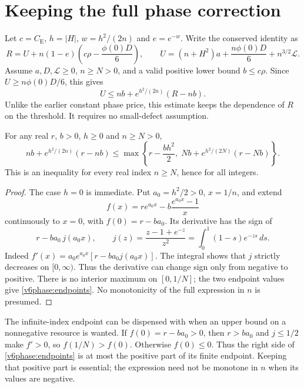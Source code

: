 \section{Keeping the full phase correction}
\label{v6phase:section}

Let $c=C_{\mathrm E}$, $h=|H|$, $w=h^2/(2n)$ and $e=e^{-w}$.
Write the conserved identity as
\[
 R=U+n(1-e)\left(c\rho-\frac{\phi(0)D}{6}\right),\qquad
 U=(n+H^2)a+\frac{n\phi(0)D}{6}+n^{3/2}\mathcal L.
\]
Assume $a,D,\mathcal L\ge0$, $n\ge N>0$, and a valid positive lower
bound $b\le c\rho$. Since $U\ge n\phi(0)D/6$, this gives
\begin{equation}\label{v6phase:exact}
 U\le nb+e^{h^2/(2n)}(R-nb).
\end{equation}
Unlike the earlier constant phase price, this estimate keeps the dependence
of $R$ on the threshold. It requires no small-defect assumption.

\begin{lemma}
\label{v6phase:index}
For any real $r$, $b>0$, $h\ge0$ and $n\ge N>0$,
\begin{equation}\label{v6phase:endpoints}
 nb+e^{h^2/(2n)}(r-nb)
 \le\max\left\{r-\frac{bh^2}{2},\;
 Nb+e^{h^2/(2N)}(r-Nb)\right\}.
\end{equation}
This is an inequality for every real index $n\ge N$, hence for all integers.
\end{lemma}
\begin{proof}
The case $h=0$ is immediate. Put $a_0=h^2/2>0$, $x=1/n$, and extend
\[
 f(x)=re^{a_0x}-b\frac{e^{a_0x}-1}{x}
\]
continuously to $x=0$, with $f(0)=r-ba_0$. Its derivative has the sign of
\[
 r-ba_0\,j(a_0x),\qquad
 j(z)=\frac{z-1+e^{-z}}{z^2}
     =\int_0^1(1-s)e^{-zs}\,ds.
\]
Indeed $f'(x)=a_0e^{a_0x}[r-ba_0j(a_0x)]$.
The integral shows that $j$ strictly decreases on $[0,\infty)$.
Thus the derivative can change sign only from negative to positive.
There is no interior maximum on $[0,1/N]$; the two endpoint values give
\eqref{v6phase:endpoints}. No monotonicity of the full expression in $n$
is presumed.
\end{proof}

The infinite-index endpoint can be dispensed with when an upper bound
on a nonnegative resource is wanted. If $f(0)=r-ba_0>0$, then
$r>ba_0$ and $j\le1/2$ make $f'>0$, so $f(1/N)>f(0)$.
Otherwise $f(0)\le0$. Thus the right side of
\eqref{v6phase:endpoints} is at most the positive part of its finite
endpoint. Keeping that positive part is essential; the expression need
not be monotone in $n$ when its values are negative.

